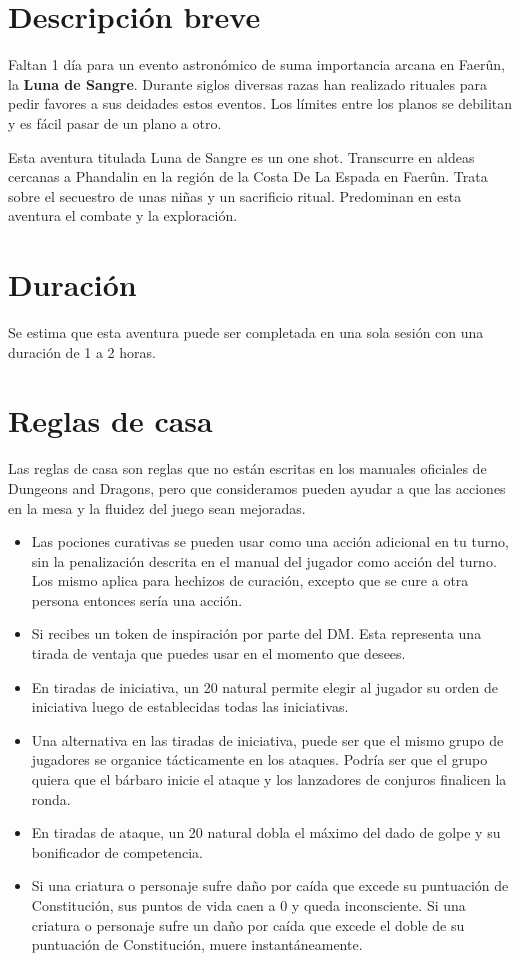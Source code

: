 \documentclass[10pt,twoside,twocolumn,openany]{dndbook}
\begin{document}
\section*{Descripción breve}

Faltan 1 día para un evento astronómico de suma importancia arcana en Faerûn, la \textbf{Luna de Sangre}. 
Durante siglos diversas razas han realizado rituales para pedir favores a sus deidades estos eventos.
Los límites entre los planos se debilitan y es fácil pasar de un plano a otro.

Esta aventura titulada Luna de Sangre es un one shot. Transcurre en aldeas cercanas a Phandalin en 
la región de la Costa De La Espada en Faerûn. Trata sobre el secuestro de unas niñas y un 
sacrificio ritual. Predominan en esta aventura el combate y la exploración.

\section*{Duración}

Se estima que esta aventura puede ser completada en una sola sesión con una duración de 1 a 2 
horas.

\section*{Reglas de casa}

Las reglas de casa son reglas que no están escritas en los manuales oficiales de Dungeons and 
Dragons, pero que consideramos pueden ayudar a que las acciones en la mesa y la fluidez del juego 
sean mejoradas.

\begin{itemize}
  \item Las pociones curativas se pueden usar como una acción adicional en tu turno, sin la 
  penalización descrita en el manual del jugador como acción del turno. Los mismo aplica para 
  hechizos de curación, excepto que se cure a otra persona entonces sería una acción.
  \item Si recibes un token de inspiración por parte del DM. Esta representa una tirada de 
  ventaja que puedes usar en el momento que desees.
  \item En tiradas de iniciativa, un 20 natural permite elegir al jugador su orden de 
  iniciativa luego de establecidas todas las iniciativas.
  \item Una alternativa en las tiradas de iniciativa, puede ser que el mismo grupo de jugadores
  se organice tácticamente en los ataques. Podría ser que el grupo quiera que el bárbaro inicie
  el ataque y los lanzadores de conjuros finalicen la ronda.
  \item En tiradas de ataque, un 20 natural dobla el máximo del dado de golpe y su bonificador 
  de competencia.
  \item Si una criatura o personaje sufre daño por caída que excede su puntuación de Constitución, 
  sus puntos de vida caen a 0 y queda inconsciente. Si una criatura o personaje sufre un daño por 
  caída que excede el doble de su puntuación de Constitución, muere instantáneamente.
\end{itemize}
\end{document}
